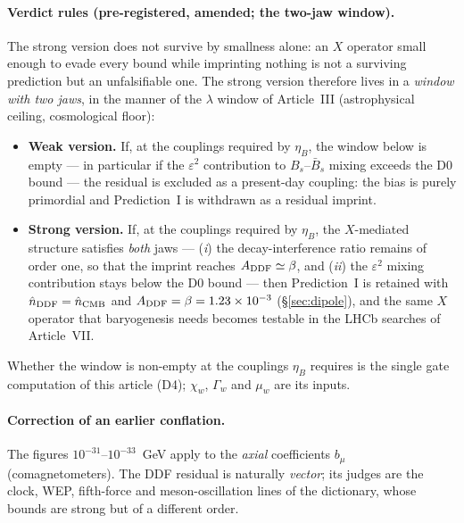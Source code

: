 \paragraph{Verdict rules (pre-registered, amended; the two-jaw window).}
The strong version does not survive by smallness alone: an $X$ operator small
enough to evade every bound while imprinting nothing is not a surviving
prediction but an unfalsifiable one. The strong version therefore lives in a
\emph{window with two jaws}, in the manner of the $\lambda$ window of
Article~III (astrophysical ceiling, cosmological floor):
\begin{itemize}
\item \textbf{Weak version.} If, at the couplings required by $\eta_B$, the
window below is empty --- in particular if the $\varepsilon^2$ contribution to
$B_s$--$\bar B_s$ mixing exceeds the D0 bound --- the residual is excluded as a
present-day coupling: the bias is purely primordial and Prediction~I is
withdrawn as a residual imprint.
\item \textbf{Strong version.} If, at the couplings required by $\eta_B$, the
$X$-mediated structure satisfies \emph{both} jaws ---
(\emph{i}) the decay-interference ratio remains of order one, so that the
imprint reaches $A_{\rm DDF}\simeq\beta$, and
(\emph{ii}) the $\varepsilon^2$ mixing contribution stays below the D0 bound
--- then Prediction~I is retained with $\hat n_{\rm DDF}=\hat n_{\rm CMB}$ and
$A_{\rm DDF}=\beta=1.23\times10^{-3}$ (\S\ref{sec:dipole}), and the same $X$
operator that baryogenesis needs becomes testable in the LHCb searches of
Article~VII.
\end{itemize}
Whether the window is non-empty at the couplings $\eta_B$ requires is the
single gate computation of this article (D4); $\chi_w$, $\Gamma_w$ and $\mu_w$
are its inputs.

\paragraph{Correction of an earlier conflation.}
The figures $10^{-31}$--$10^{-33}$~GeV apply to the \emph{axial} coefficients
$b_\mu$ (comagnetometers). The DDF residual is naturally \emph{vector}; its
judges are the clock, WEP, fifth-force and meson-oscillation lines of the
dictionary, whose bounds are strong but of a different order.

